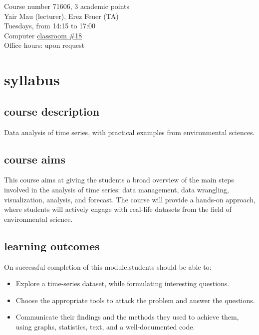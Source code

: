 \documentclass[
  letterpaper,
  DIV=11,
  numbers=noendperiod,
  oneside]{scrreprt}
\providecommand{\tightlist}{%
  \setlength{\itemsep}{0pt}\setlength{\parskip}{0pt}}\usepackage{longtable,booktabs,array}
\begin{document}
Course number 71606, 3 academic points\\
Yair Mau (lecturer), Erez Feuer (TA)\\
Tuesdays, from 14:15 to 17:00\\
Computer \href{https://goo.gl/maps/rzniv9NuyEs4ETH58}{classroom \#18}\\
Office hours: upon request

\hypertarget{syllabus}{%
\section*{syllabus}\label{syllabus}}


\hypertarget{course-description}{%
\subsection*{course description}\label{course-description}}

Data analysis of time series, with practical examples from environmental
sciences.

\hypertarget{course-aims}{%
\subsection*{course aims}\label{course-aims}}

This course aims at giving the students a broad overview of the main
steps involved in the analysis of time series: data management, data
wrangling, visualization, analysis, and forecast. The course will
provide a hands-on approach, where students will actively engage with
real-life datasets from the field of environmental science.

\hypertarget{learning-outcomes}{%
\subsection*{learning outcomes}\label{learning-outcomes}}

On successful completion of this module,students should be able to:

\begin{itemize}
\tightlist
\item
  Explore a time-series dataset, while formulating interesting
  questions.
\item
  Choose the appropriate tools to attack the problem and answer the
  questions.
\item
  Communicate their findings and the methods they used to achieve them,
  using graphs, statistics, text, and a well-documented code.
\end{itemize}
\end{document}
